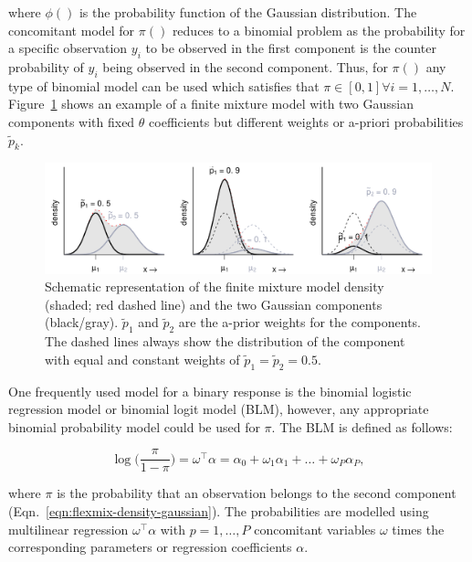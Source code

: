 \documentclass[article,nojss,shortnames]{jss}
\begin{document}
where $\phi()$ is the probability function of the Gaussian distribution.
The concomitant model for $\pi()$ reduces to a binomial problem as the probability
for a specific observation $y_i$ to be observed in the first component is the
counter probability of $y_i$ being observed in the second component.
Thus, for $\pi()$ any type of binomial model can be used which satisfies
that $\pi \in [0,1] \forall i=1,\dots,N$.
Figure~\ref{fig:schematic_density} shows an example of a finite mixture model with
two Gaussian components with fixed $\mathit{\theta}$ coefficients but different
weights or a-priori probabilities $\tilde{p}_k$.


\begin{figure}[h]
    \centering
    \includegraphics[width = .8\textwidth]{draft_schematic_density}
    \caption{Schematic representation of the finite mixture model density
    (shaded; red dashed line) and the two Gaussian components (black/gray). 
    $\tilde{p}_1$ and $\tilde{p}_2$ are the a-prior weights for the components.
    The dashed lines always show the distribution of the component with equal
    and constant weights of $\tilde{p}_1 = \tilde{p}_2 = 0.5$.}
    \label{fig:schematic_density}
\end{figure}

One frequently used model for a binary response is the binomial logistic regression
model or binomial logit model (BLM), however, any appropriate binomial probability
model could be used for $\pi$.
The BLM is defined as follows:

\begin{equation}
    \log\Big(\frac{\pi}{1 - \pi}\Big) =
        \omega^\top \alpha = \alpha_0 + \omega_1 \alpha_1 + \dots + \omega_P \alpha_P,
\end{equation}

where $\mathit{\pi}$ is the probability that an observation belongs to the
second component (Eqn.~\ref{eqn:flexmix-density-gaussian}).
The probabilities are modelled using multilinear regression
$\mathit{\omega}^\top \mathit{\alpha}$ with $p=1,\dots,P$ concomitant
variables $\mathit{\omega}$ times the corresponding parameters or regression
coefficients $\mathit{\alpha}$.
\end{document}
